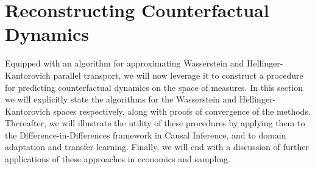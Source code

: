 \documentclass[11pt]{article}
\newcommand{\tls}[1]{{\color{cyan}[TLS: #1]}}
\begin{document}








\section{Reconstructing Counterfactual Dynamics}

Equipped with an algorithm for approximating Wasserstein and Hellinger-Kantorovich parallel transport, we will now leverage it to construct a procedure for predicting counterfactual dynamics on the space of measures. In this section we will explicitly state the algorithms for the Wasserstein and Hellinger-Kantorovich spaces respectively, along with proofs of convergence of the methods. Thereafter, we will illustrate the utility of these procedures by applying them to the Difference-in-Differences framework in Causal Inference, and to domain adaptation and transfer learning. Finally, we will end with a discussion of further applications of these approaches in economics and sampling.
\end{document}
